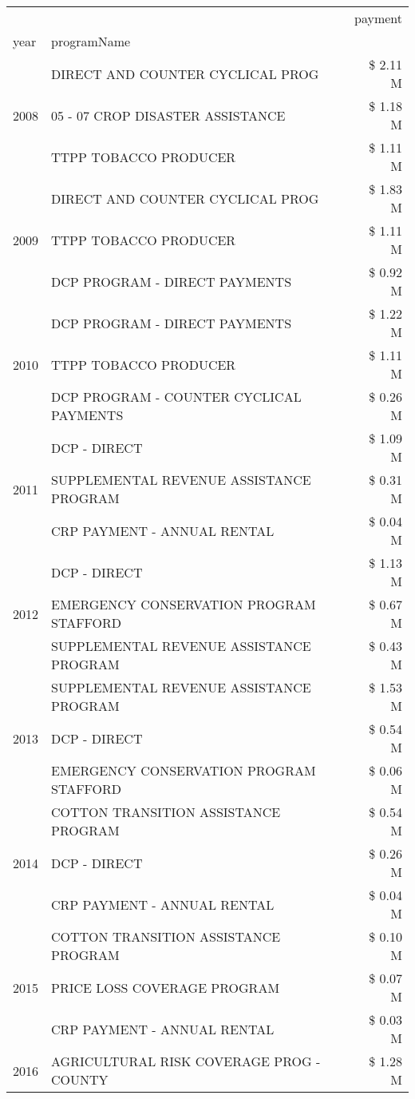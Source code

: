 \begin{tabular}{llr}
\toprule
 &  & payment \\
year & programName &  \\
\midrule
\multirow[t]{3}{*}{2008} & DIRECT AND COUNTER CYCLICAL PROG & \$ 2.11 M \\
 & 05 - 07 CROP DISASTER ASSISTANCE & \$ 1.18 M \\
 & TTPP TOBACCO PRODUCER & \$ 1.11 M \\
\cline{1-3}
\multirow[t]{3}{*}{2009} & DIRECT AND COUNTER CYCLICAL PROG & \$ 1.83 M \\
 & TTPP TOBACCO PRODUCER & \$ 1.11 M \\
 & DCP PROGRAM - DIRECT PAYMENTS & \$ 0.92 M \\
\cline{1-3}
\multirow[t]{3}{*}{2010} & DCP PROGRAM - DIRECT PAYMENTS & \$ 1.22 M \\
 & TTPP TOBACCO PRODUCER & \$ 1.11 M \\
 & DCP PROGRAM - COUNTER CYCLICAL PAYMENTS & \$ 0.26 M \\
\cline{1-3}
\multirow[t]{3}{*}{2011} & DCP - DIRECT & \$ 1.09 M \\
 & SUPPLEMENTAL REVENUE ASSISTANCE PROGRAM & \$ 0.31 M \\
 & CRP PAYMENT - ANNUAL RENTAL & \$ 0.04 M \\
\cline{1-3}
\multirow[t]{3}{*}{2012} & DCP - DIRECT & \$ 1.13 M \\
 & EMERGENCY CONSERVATION PROGRAM STAFFORD & \$ 0.67 M \\
 & SUPPLEMENTAL REVENUE ASSISTANCE PROGRAM & \$ 0.43 M \\
\cline{1-3}
\multirow[t]{3}{*}{2013} & SUPPLEMENTAL REVENUE ASSISTANCE PROGRAM & \$ 1.53 M \\
 & DCP - DIRECT & \$ 0.54 M \\
 & EMERGENCY CONSERVATION PROGRAM STAFFORD & \$ 0.06 M \\
\cline{1-3}
\multirow[t]{3}{*}{2014} & COTTON TRANSITION ASSISTANCE PROGRAM & \$ 0.54 M \\
 & DCP - DIRECT & \$ 0.26 M \\
 & CRP PAYMENT - ANNUAL RENTAL & \$ 0.04 M \\
\cline{1-3}
\multirow[t]{3}{*}{2015} & COTTON TRANSITION ASSISTANCE PROGRAM & \$ 0.10 M \\
 & PRICE LOSS COVERAGE PROGRAM & \$ 0.07 M \\
 & CRP PAYMENT - ANNUAL RENTAL & \$ 0.03 M \\
\cline{1-3}
\multirow[t]{3}{*}{2016} & AGRICULTURAL RISK COVERAGE PROG - COUNTY & \$ 1.28 M \\

\end{tabular}
